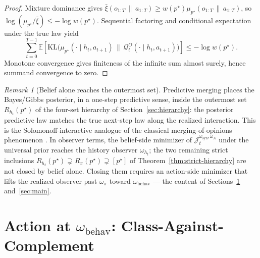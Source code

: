 \documentclass[11pt]{article}
\theoremstyle{definition}
\theoremstyle{remark}
\newtheorem{remark}[theorem]{Remark}
\newcommand{\Qcal}{\mathcal{Q}}
\newcommand{\E}{\mathbb{E}}
\newcommand{\KL}{\mathrm{KL}}
\newcommand{\givena}{\,\|\,}
\newcommand{\barxi}{\bar{\xi}}
\begin{document}
\begin{proof}
Mixture dominance gives $\barxi(o_{1:T}\givena a_{1:T})\ge w(p^\star)\mu_{p^\star}(o_{1:T}\givena a_{1:T})$, so $\log(\mu_{p^\star}/\barxi)\le -\log w(p^\star)$. Sequential factoring and conditional expectation under the true law yield
\[
\sum_{t=0}^{T-1}\E\!\left[\KL\!\bigl(\mu_{p^\star}(\cdot\mid h_t,a_{t+1})\,\|\,\Qcal_t^O(\cdot\mid h_t,a_{t+1})\bigr)\right]
\le -\log w(p^\star).
\]
Monotone convergence gives finiteness of the infinite sum almost surely, hence summand convergence to zero.
\end{proof}

\begin{remark}[Belief alone reaches the outermost set]
\label{rem:belief-reaches-Rht}
Predictive merging places the Bayes/Gibbs posterior, in a one-step predictive sense, inside the outermost set $R_{h_t}(p^\star)$ of the four-set hierarchy of Section~\ref{sec:hierarchy}: the posterior predictive law matches the true next-step law along the realized interaction. This is the Solomonoff-interactive analogue of the classical merging-of-opinions phenomenon \citep{BlackwellDubins1962}. In observer terms, the belief-side minimizer of $\mathcal J_t^{\omega_{\mathrm{syn}},\omega_A}$ under the universal prior reaches the history observer $\omega_{h_t}$; the two remaining strict inclusions $R_{h_t}(p^\star)\supsetneq R_\pi(p^\star)\supsetneq[p^\star]$ of Theorem~\ref{thm:strict-hierarchy} are not closed by belief alone. Closing them requires an action-side minimizer that lifts the realized observer past $\omega_\pi$ toward $\omega_{\mathrm{behav}}$ --- the content of Sections~\ref{sec:semantic-action} and~\ref{sec:main}.
\end{remark}


\section{Action at $\omega_{\mathrm{behav}}$: Class-Against-Complement}
\label{sec:semantic-action}
\end{document}
